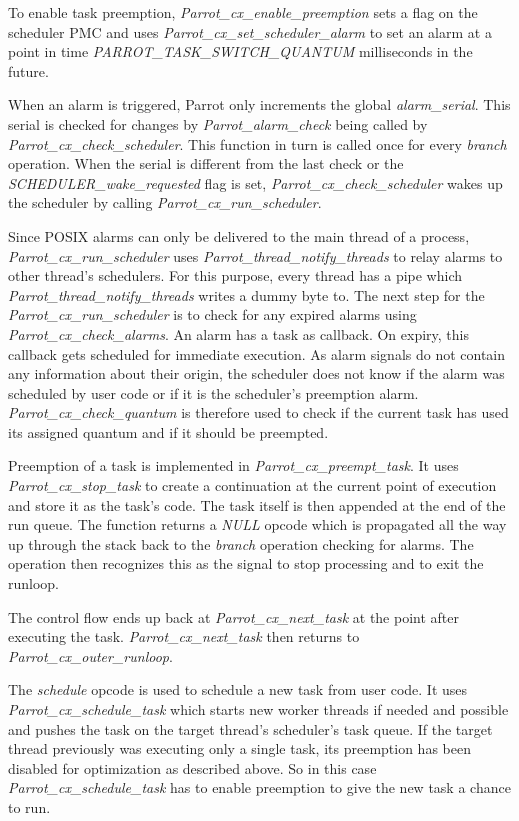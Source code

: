 \documentclass[bachelor,english]{hgbthesis}
\begin{document}
To enable task preemption, \textit{Parrot\_cx\_enable\_preemption} sets a flag on the scheduler PMC and uses \textit{Parrot\_cx\_set\_scheduler\_alarm} to set an alarm at a point in time \textit{PARROT\_TASK\_SWITCH\_QUANTUM} milliseconds in the future.

When an alarm is triggered, Parrot only increments the global \textit{alarm\_serial}. This serial is checked for changes by \textit{Parrot\_alarm\_check} being called by \textit{Parrot\_cx\_check\_scheduler}. This function in turn is called once for every \textit{branch} operation. When the serial is different from the last check or the \textit{SCHEDULER\_wake\_requested} flag is set, \textit{Parrot\_cx\_check\_scheduler} wakes up the scheduler by calling \textit{Parrot\_cx\_run\_scheduler}.

Since POSIX alarms can only be delivered to the main thread of a process, \textit{Parrot\_cx\_run\_scheduler} uses \textit{Parrot\_thread\_notify\_threads} to relay alarms to other thread's schedulers. For this purpose, every thread has a pipe which \textit{Parrot\_thread\_notify\_threads} writes a dummy byte to. The next step for the \textit{Parrot\_cx\_run\_scheduler} is to check for any expired alarms using \textit{Parrot\_cx\_check\_alarms}. An alarm has a task as callback. On expiry, this callback gets scheduled for immediate execution. As alarm signals do not contain any information about their origin, the scheduler does not know if the alarm was scheduled by user code or if it is the scheduler's preemption alarm. \textit{Parrot\_cx\_check\_quantum} is therefore used to check if the current task has used its assigned quantum and if it should be preempted.

Preemption of a task is implemented in \textit{Parrot\_cx\_preempt\_task}. It uses \textit{Parrot\_cx\_stop\_task} to create a continuation at the current point of execution and store it as the task's code. The task itself is then appended at the end of the run queue. The function returns a \textit{NULL} opcode which is propagated all the way up through the stack back to the \textit{branch} operation checking for alarms. The operation then recognizes this as the signal to stop processing and to exit the runloop.

The control flow ends up back at \textit{Parrot\_cx\_next\_task} at the point after executing the task. \textit{Parrot\_cx\_next\_task} then returns to \textit{Parrot\_cx\_outer\_runloop}.

The \textit{schedule} opcode is used to schedule a new task from user code. It uses \textit{Parrot\_cx\_schedule\_task} which starts new worker threads if needed and possible and pushes the task on the target thread's scheduler's task queue. If the target thread previously was executing only a single task, its preemption has been disabled for optimization as described above. So in this case \textit{Parrot\_cx\_schedule\_task} has to enable preemption to give the new task a chance to run.
\end{document}
